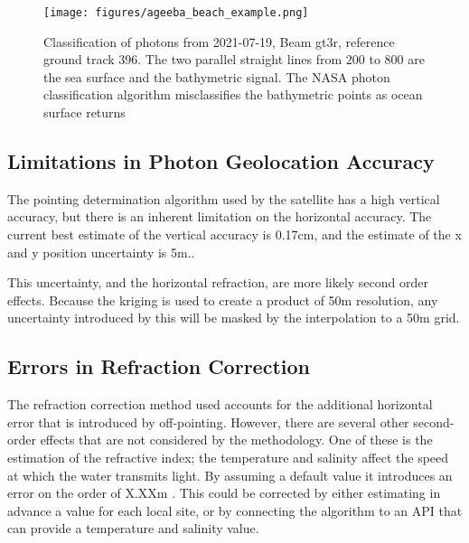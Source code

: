 \begin{figure}[htbp]
    \centering
    \texttt{[image: figures/ageeba\_beach\_example.png]}
    \caption{Classification of photons from 2021-07-19, Beam gt3r, reference ground track 396. The two parallel straight lines from 200 to 800 are the sea surface and the bathymetric signal. The NASA photon classification algorithm misclassifies the bathymetric points as ocean surface returns}
    \label{fig:ageeba_bad_classes}
\end{figure}



\subsection{Limitations in Photon Geolocation Accuracy}

The pointing determination algorithm used by the satellite has a high vertical accuracy, but there is an inherent limitation on the horizontal accuracy. The current best estimate of the vertical accuracy is 0.17cm, and the estimate of the x and y position uncertainty is 5m..

This uncertainty, and the horizontal refraction, are more likely second order effects. Because the kriging is used to create a product of 50m resolution, any uncertainty introduced by this will be masked by the interpolation to a 50m grid.


\subsection{Errors in Refraction Correction}

The refraction correction method used accounts for the additional horizontal error that is introduced by off-pointing. However, there are several other second-order effects that are not considered by the methodology. One of these is the estimation of the refractive index; the temperature and salinity affect the speed at which the water transmits light. By assuming a default value it introduces an error on the order of X.XXm . This could be corrected by either estimating in advance a value for each local site, or by connecting the algorithm to an API that can provide a temperature and salinity value. 

